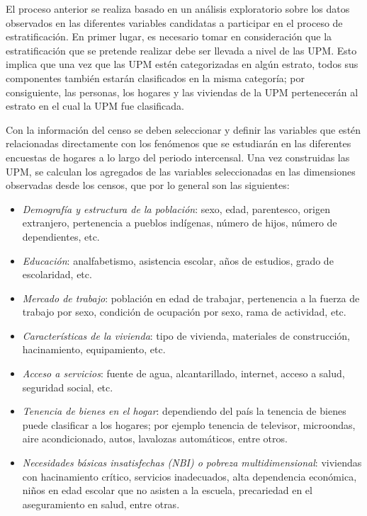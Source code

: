 \documentclass[
  12pt,
]{book}
\providecommand{\tightlist}{%
  \setlength{\itemsep}{0pt}\setlength{\parskip}{0pt}}
\begin{document}
El proceso anterior se realiza basado en un análisis exploratorio sobre los datos observados en las diferentes variables candidatas a participar en el proceso de estratificación. En primer lugar, es necesario tomar en consideración que la estratificación que se pretende realizar debe ser llevada a nivel de las UPM. Esto implica que una vez que las UPM estén categorizadas en algún estrato, todos sus componentes también estarán clasificados en la misma categoría; por consiguiente, las personas, los hogares y las viviendas de la UPM pertenecerán al estrato en el cual la UPM fue clasificada.

Con la información del censo se deben seleccionar y definir las variables que estén relacionadas directamente con los fenómenos que se estudiarán en las diferentes encuestas de hogares a lo largo del periodo intercensal. Una vez construidas las UPM, se calculan los agregados de las variables seleccionadas en las dimensiones observadas desde los censos, que por lo general son las siguientes:

\begin{itemize}
\tightlist
\item
  \emph{Demografía y estructura de la población}: sexo, edad, parentesco, origen extranjero, pertenencia a pueblos indígenas, número de hijos, número de dependientes, etc.
\item
  \emph{Educación}: analfabetismo, asistencia escolar, años de estudios, grado de escolaridad, etc.
\item
  \emph{Mercado de trabajo}: población en edad de trabajar, pertenencia a la fuerza de trabajo por sexo, condición de ocupación por sexo, rama de actividad, etc.
\item
  \emph{Características de la vivienda}: tipo de vivienda, materiales de construcción, hacinamiento, equipamiento, etc.
\item
  \emph{Acceso a servicios}: fuente de agua, alcantarillado, internet, acceso a salud, seguridad social, etc.
\item
  \emph{Tenencia de bienes en el hogar}: dependiendo del país la tenencia de bienes puede clasificar a los hogares; por ejemplo tenencia de televisor, microondas, aire acondicionado, autos, lavalozas automáticos, entre otros.
\item
  \emph{Necesidades básicas insatisfechas (NBI) o pobreza multidimensional}: viviendas con hacinamiento crítico, servicios inadecuados, alta dependencia económica, niños en edad escolar que no asisten a la escuela, precariedad en el aseguramiento en salud, entre otras.
\end{itemize}
\end{document}
